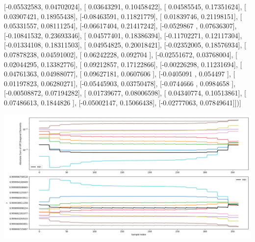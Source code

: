 \documentclass{article}
\begin{document}
       [-0.05532583,  0.04702024],
       [ 0.03643291,  0.10458422],
       [ 0.04585545,  0.17351624],
       [ 0.03907421,  0.18955438],
       [-0.08463591,  0.11821779],
       [ 0.01839746,  0.21198151],
       [ 0.05331557,  0.08111254],
       [-0.06617404,  0.21417242],
       [-0.0529867 ,  0.07636307],
       [-0.10841532,  0.23693346],
       [ 0.04577401,  0.18386394],
       [-0.11702271,  0.12117304],
       [-0.01334108,  0.18311503],
       [ 0.04954825,  0.20018421],
       [-0.02352005,  0.18576934],
       [ 0.07878238,  0.04591002],
       [ 0.06242228,  0.092704  ],
       [-0.02551672,  0.03768004],
       [ 0.02044295,  0.13382776],
       [ 0.09212857,  0.17122866],
       [-0.00226298,  0.11231694],
       [ 0.04761363,  0.04988077],
       [ 0.09627181,  0.0607606 ],
       [-0.0405091 ,  0.054497  ],
       [ 0.01197823,  0.06280271],
       [-0.05445903,  0.03750478],
       [-0.0744666 ,  0.0984658 ],
       [-0.00508872,  0.07194282],
       [ 0.01739677,  0.08006598],
       [ 0.04340774,  0.10513861],
       [ 0.07486613,  0.1844826 ],
       [-0.05002147,  0.15066438],
       [-0.02777063,  0.07849641]])]
\begin{center}
\includegraphics[scale=.9]{report_pickled_controls127/control_dpn_all.png}

\end{center}
\end{document}
